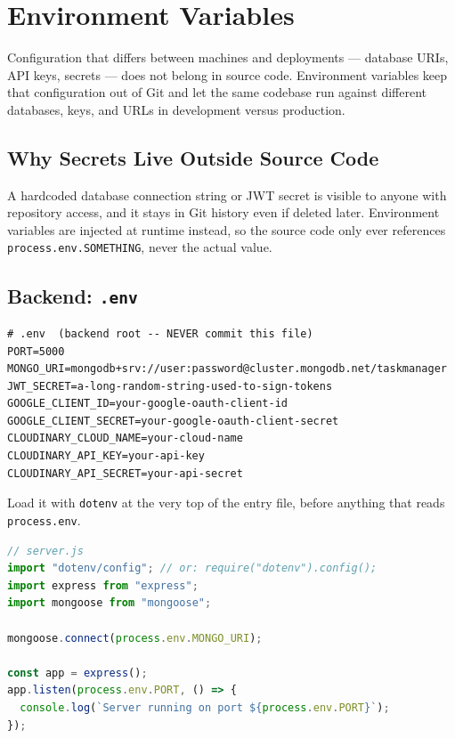 \chapter{Environment Variables}

Configuration that differs between machines and deployments --- database
URIs, API keys, secrets --- does not belong in source code. Environment
variables keep that configuration out of Git and let the same codebase run
against different databases, keys, and URLs in development versus
production.

\section{Why Secrets Live Outside Source Code}

A hardcoded database connection string or JWT secret is visible to anyone
with repository access, and it stays in Git history even if deleted later.
Environment variables are injected at runtime instead, so the source code
only ever references \texttt{process.env.SOMETHING}, never the actual value.

\section{Backend: \texttt{.env}}

\begin{lstlisting}
# .env  (backend root -- NEVER commit this file)
PORT=5000
MONGO_URI=mongodb+srv://user:password@cluster.mongodb.net/taskmanager
JWT_SECRET=a-long-random-string-used-to-sign-tokens
GOOGLE_CLIENT_ID=your-google-oauth-client-id
GOOGLE_CLIENT_SECRET=your-google-oauth-client-secret
CLOUDINARY_CLOUD_NAME=your-cloud-name
CLOUDINARY_API_KEY=your-api-key
CLOUDINARY_API_SECRET=your-api-secret
\end{lstlisting}

Load it with \texttt{dotenv} at the very top of the entry file, before
anything that reads \texttt{process.env}.

\begin{lstlisting}[language=JavaScript]
// server.js
import "dotenv/config"; // or: require("dotenv").config();
import express from "express";
import mongoose from "mongoose";

mongoose.connect(process.env.MONGO_URI);

const app = express();
app.listen(process.env.PORT, () => {
  console.log(`Server running on port ${process.env.PORT}`);
});
\end{lstlisting}

